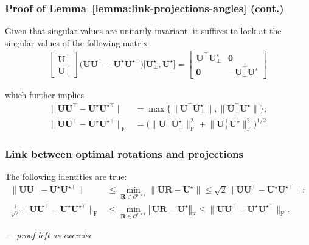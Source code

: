 \documentclass[compress,
mathserif,wide,%
]{beamer}
\begin{document}
\begin{frame}
\frametitle{Proof of Lemma~\ref{lemma:link-projections-angles} (cont.)}
Given that singular values are unitarily invariant, it suffices to look at
the singular values of the following matrix
%
\begin{align*}
\left[\begin{array}{c}
\bm{U}^{\top}\\
\bm{U}_{\perp}^{\top}
\end{array}\right]\big(\bm{U}\bm{U}^{\top}- {\bm{U}}^{\star} {\bm{U}}^{\star\top}\big)
	\big[
{\bm{U}}_{\perp}^{\star} , {\bm{U}}^{\star} \big]=\left[\begin{array}{cc}
	\bm{U}^{\top}{\bm{U}}_{\perp}^{\star} & \bm{0}\\
\bm{0} & -\bm{U}_{\perp}^{\top} {\bm{U}}^{\star}
\end{array}\right]
\end{align*}

which further implies
\begin{subequations}
\begin{align*}
	\big\|\bm{U}\bm{U}^{\top}-\bm{U}^{\star}\bm{U}^{\star\top}\big\| &= \max\big\{\big\|\bm{U}^{\top}\bm{U}_{\perp}^{\star}\big\|,\big\|\bm{U}_{\perp}^{\top}\bm{U}^{\star}\big\|\big\}; \\
	\big\|\bm{U}\bm{U}^{\top}-\bm{U}^{\star}\bm{U}^{\star\top}\big\|_{\mathrm{F}} & =\Big(\big\|\bm{U}^{\top}\bm{U}_{\perp}^{\star}\big\|_{\mathrm{F}}^{2}+\big\|\bm{U}_{\perp}^{\top}\bm{U}^{\star}\big\|_{\mathrm{F}}^{2}\Big)^{1/2}
\end{align*}
\end{subequations}

\end{frame}




\begin{frame}
	\frametitle{Link between optimal rotations and projections}
	\begin{lemma}\label{prop:rotation-UR}
	The following identities are true:
\begin{align*}
	\|\bm{U}\bm{U}^{\top} - \bm{U}^{\star}\bm{U}^{\star\top} \|
	&\leq
	\min_{\bm{R}\in \mathcal{O}^{r\times r}}\big\|\bm{U}\bm{R}-\bm{U}^{\star}\big\|
	\leq \sqrt{2} \|\bm{U}\bm{U}^{\top} - \bm{U}^{\star}\bm{U}^{\star\top} \|; \\
	\tfrac{1}{\sqrt{2}} \|\bm{U}\bm{U}^{\top} - \bm{U}^{\star}\bm{U}^{\star\top} \|_{\mathrm{F}}
	&\leq
	\min_{\bm{R}\in\mathcal{O}^{r\times r}}\left\Vert \bm{U}\bm{R}-\bm{U}^{\star}\right\Vert _{\mathrm{F}}
	\leq \|\bm{U}\bm{U}^{\top} - \bm{U}^{\star}\bm{U}^{\star\top} \|_{\mathrm{F}}.
\end{align*}
\end{lemma}

{\hfill \footnotesize \em --- proof left as exercise}
\end{frame}
\end{document}
